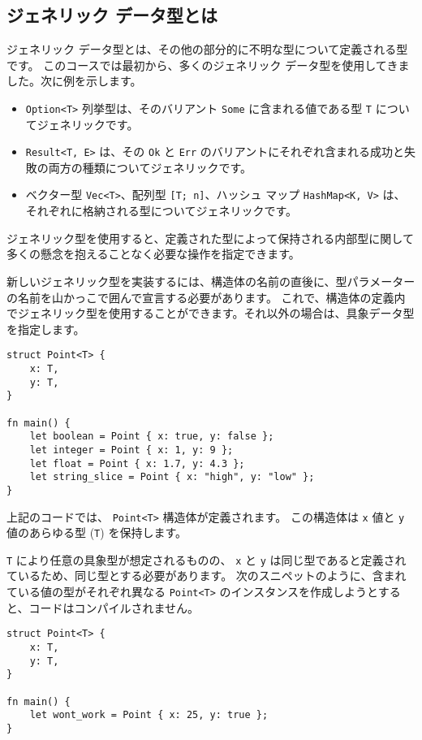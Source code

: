 \subsection{ジェネリック データ型とは}

ジェネリック データ型とは、その他の部分的に不明な型について定義される型です。 このコースでは最初から、多くのジェネリック データ型を使用してきました。次に例を示します。

\begin{itemize}
\item \texttt{Option<T>} 列挙型は、そのバリアント \texttt{Some} に含まれる値である型 \texttt{T} についてジェネリックです。
\item \texttt{Result<T, E>} は、その \texttt{Ok} と \texttt{Err} のバリアントにそれぞれ含まれる成功と失敗の両方の種類についてジェネリックです。
\item ベクター型 \texttt{Vec<T>}、配列型 \texttt{[T; n]}、ハッシュ マップ \texttt{HashMap<K, V>} は、それぞれに格納される型についてジェネリックです。
\end{itemize}

ジェネリック型を使用すると、定義された型によって保持される内部型に関して多くの懸念を抱えることなく必要な操作を指定できます。

新しいジェネリック型を実装するには、構造体の名前の直後に、型パラメーターの名前を山かっこで囲んで宣言する必要があります。 これで、構造体の定義内でジェネリック型を使用することができます。それ以外の場合は、具象データ型を指定します。


\begin{lstlisting}[numbers=none]
struct Point<T> {
    x: T,
    y: T,
}

fn main() {
    let boolean = Point { x: true, y: false };
    let integer = Point { x: 1, y: 9 };
    let float = Point { x: 1.7, y: 4.3 };
    let string_slice = Point { x: "high", y: "low" };
}
\end{lstlisting}

上記のコードでは、 \texttt{Point<T>} 構造体が定義されます。 この構造体は \texttt{x} 値と \texttt{y} 値のあらゆる型 (\texttt{T}) を保持します。

\texttt{T} により任意の具象型が想定されるものの、 \texttt{x} と \texttt{y} は同じ型であると定義されているため、同じ型とする必要があります。 次のスニペットのように、含まれている値の型がそれぞれ異なる \texttt{Point<T>} のインスタンスを作成しようとすると、コードはコンパイルされません。

\begin{lstlisting}[numbers=none]
struct Point<T> {
    x: T,
    y: T,
}

fn main() {
    let wont_work = Point { x: 25, y: true };
}
\end{lstlisting}


